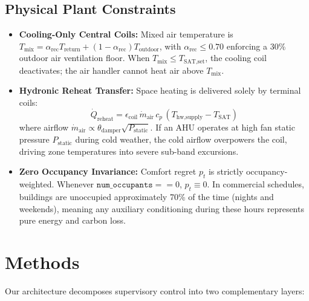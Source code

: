 \documentclass{article}
\begin{document}
\subsection{Physical Plant Constraints}
\begin{itemize}[leftmargin=*]
    \item \textbf{Cooling-Only Central Coils:} Mixed air temperature is $T_{\text{mix}} = \alpha_{\text{rec}} T_{\text{return}} + (1 - \alpha_{\text{rec}}) T_{\text{outdoor}}$, with $\alpha_{\text{rec}} \le 0.70$ enforcing a 30\% outdoor air ventilation floor. When $T_{\text{mix}} \le T_{\text{SAT,set}}$, the cooling coil deactivates; the air handler cannot heat air above $T_{\text{mix}}$.
    \item \textbf{Hydronic Reheat Transfer:} Space heating is delivered solely by terminal coils:
    \begin{equation}
    \dot{Q}_{\text{reheat}} = \epsilon_{\text{coil}} \, \dot{m}_{\text{air}} \, c_p \, (T_{\text{hw,supply}} - T_{\text{SAT}})
    \end{equation}
    where airflow $\dot{m}_{\text{air}} \propto \theta_{\text{damper}} \sqrt{P_{\text{static}}}$. If an AHU operates at high fan static pressure $P_{\text{static}}$ during cold weather, the cold airflow overpowers the coil, driving zone temperatures into severe sub-band excursions.
    \item \textbf{Zero Occupancy Invariance:} Comfort regret $p_t$ is strictly occupancy-weighted. Whenever $\texttt{num\_occupants} == 0$, $p_t \equiv 0$. In commercial schedules, buildings are unoccupied approximately 70\% of the time (nights and weekends), meaning any auxiliary conditioning during these hours represents pure energy and carbon loss.
\end{itemize}

\section{Methods}
Our architecture decomposes supervisory control into two complementary layers:
\end{document}
